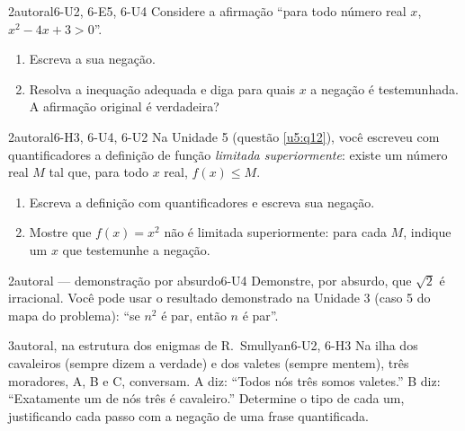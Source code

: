 \begin{questao}[integradora]{2}{autoral}{6-U2, 6-E5, 6-U4}\label{u6:q10}
Considere a afirmação \enquote{para todo número real $x$, $x^2-4x+3>0$}.
\begin{enumerate}[label=\alph*)]
  \item Escreva a sua negação.
  \item Resolva a inequação adequada e diga para quais $x$ a negação é testemunhada. A afirmação original é verdadeira?
\end{enumerate}
\end{questao}

\begin{questao}{2}{autoral}{6-H3, 6-U4, 6-U2}\label{u6:q11}
Na Unidade 5 (questão \ref{u5:q12}), você escreveu com quantificadores a definição de função \emph{limitada superiormente}: existe um número real $M$ tal que, para todo $x$ real, $f(x)\le M$.
\begin{enumerate}[label=\alph*)]
  \item Escreva a definição com quantificadores e escreva sua negação.
  \item Mostre que $f(x)=x^2$ não é limitada superiormente: para cada $M$, indique um $x$ que testemunhe a negação.
\end{enumerate}
\end{questao}

\begin{questao}{2}{autoral — demonstração por absurdo}{6-U4}\label{u6:q12}
Demonstre, por absurdo, que $\sqrt2$ é irracional. Você pode usar o resultado demonstrado na Unidade 3 (caso 5 do mapa do problema): \enquote{se $n^2$ é par, então $n$ é par}.
\end{questao}

\begin{questao}{3}{autoral, na estrutura dos enigmas de R.~Smullyan}{6-U2, 6-H3}\label{u6:q13}
Na ilha dos cavaleiros (sempre dizem a verdade) e dos valetes (sempre mentem), três moradores, A, B e C, conversam. A diz: \enquote{Todos nós três somos valetes.} B diz: \enquote{Exatamente um de nós três é cavaleiro.} Determine o tipo de cada um, justificando cada passo com a negação de uma frase quantificada.
\end{questao}

